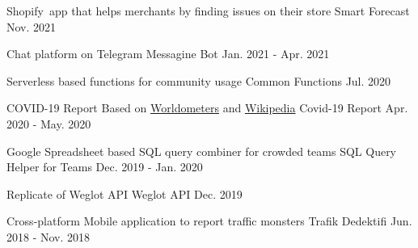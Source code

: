 

\begin{cventries}

  \cventry
    {Shopify app that helps merchants by finding issues on their store} %
    {Smart Forecast} %
    {} %
    {Nov. 2021} %
    {}

  \cventry
    {Chat platform on Telegram} %
    {Messagine Bot} %
    {} %
    {Jan. 2021 - Apr. 2021} %
    {}

  \cventry
    {Serverless based functions for community usage} %
    {Common Functions} %
    {} %
    {Jul. 2020} %
    {}

  \cventry
    {COVID-19 Report Based on \href{https://www.worldometers.info/coronavirus}{Worldometers} and \href{https://en.wikipedia.org/wiki/COVID-19_pandemic}{Wikipedia}} %
    {Covid-19 Report} %
    {} %
    {Apr. 2020 - May. 2020} %
    {}

  \cventry
    {Google Spreadsheet based SQL query combiner for crowded teams} %
    {SQL Query Helper for Teams} %
    {} %
    {Dec. 2019 - Jan. 2020} %
    {}

  \cventry
    {Replicate of Weglot API} %
    {Weglot API} %
    {} %
    {Dec. 2019} %
    {}

  \cventry
    {Cross-platform Mobile application to report traffic monsters} %
    {Trafik Dedektifi} %
    {} %
    {Jun. 2018 - Nov. 2018} %
    {}


\end{cventries}
